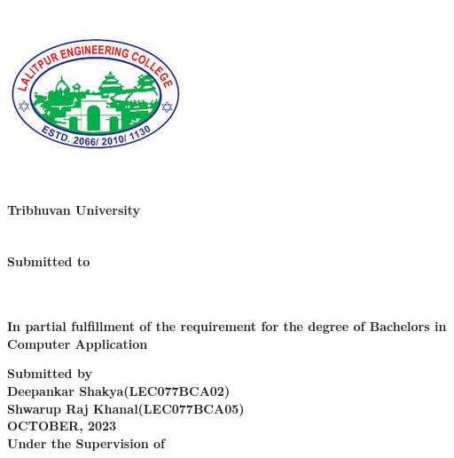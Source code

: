 \begin{center}
\begin{spacing}{1.6}
\thispagestyle{empty}

\includegraphics[scale=1]{img/Graphics/LOGO.jpeg}

\textbf{
\large{Tribhuvan University}\\
\large{\theinstitute}}\\
\vspace{0.5cm}
\textbf{\MakeUppercase{\thetitle}\\
\vspace{0.5cm} 
Submitted to\\ 
\thedepartment\\
\thecampus}\\
\vspace{0.5cm}

\textbf{In partial fulfillment of the requirement for the degree of Bachelors in Computer Application}
\bigskip

\par

\textbf{
Submitted by\\
Deepankar Shakya(LEC077BCA02)\\
Shwarup Raj Khanal(LEC077BCA05)\\
\MakeUppercase{October, 2023}}\\
\vspace{1cm}
\textbf{Under the Supervision of}\\
\textbf{\thesupervisor}

\end{spacing}
\end{center}

\clearpage